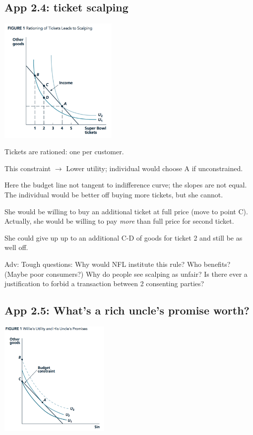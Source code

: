 \documentclass[]{article}
\begin{document}
\hypertarget{app-2.4-ticket-scalping}{%
\subsection{App 2.4: ticket scalping}\label{app-2.4-ticket-scalping}}

\includegraphics[height=2.4in]{picsfigs/scalping.png}

Tickets are rationed: one per customer.

This constraint \(\rightarrow\) Lower utility; individual would choose A if unconstrained.

Here the budget line not tangent to indifference curve; the slopes are not equal. The individual would be better off buying more tickets, but she cannot.

She would be willing to buy an additional ticket at full price (move to point C). Actually, she would be willing to pay \emph{more} than full price for second ticket.

She could give up up to an additional C-D of goods for ticket 2 and still be as well off.

\textcolor{RawSienna}{Adv: Tough questions:}
Why would NFL institute this rule? Who benefits? (Maybe poor consumers?)
Why do people see scalping as unfair? Is there ever a justification to forbid a transaction between 2 consenting parties?

\hypertarget{app-2.5-whats-a-rich-uncles-promise-worth}{%
\subsection{App 2.5: What's a rich uncle's promise worth?}\label{app-2.5-whats-a-rich-uncles-promise-worth}}

\includegraphics[height=2.2in]{picsfigs/williesuncle.png}
\end{document}
